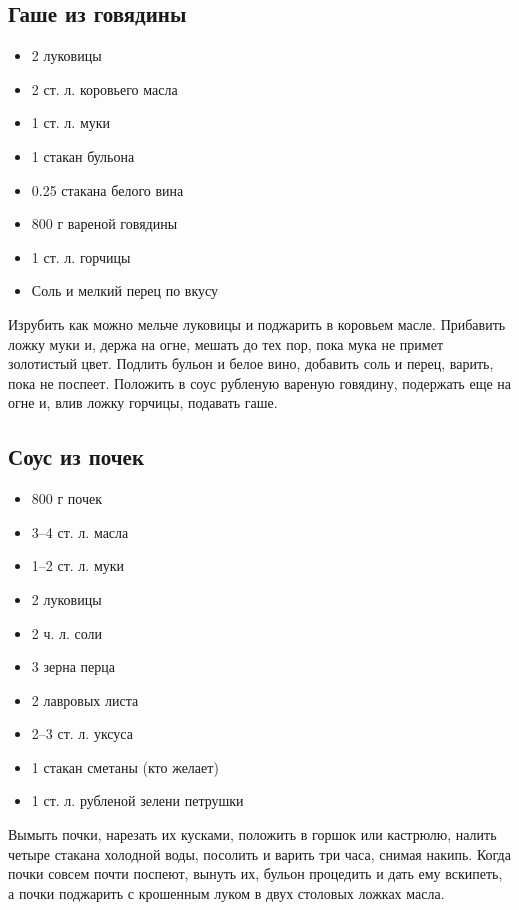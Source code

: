 \subsection{Гаше из говядины}

\begin{itemize}
	\item 2 луковицы
    \item 2 ст. л. коровьего масла 
    \item 1 ст. л. муки 
    \item 1 стакан бульона
    \item 0.25 стакана белого вина 
    \item 800 г вареной говядины
    \item 1 ст. л. горчицы
    \item Соль и мелкий перец по вкусу
\end{itemize}

Изрубить как можно мельче луковицы и поджарить в коровьем масле. Прибавить ложку муки и, держа на огне, мешать до тех пор, пока мука не примет золотистый цвет. Подлить бульон и белое вино, добавить соль и перец, варить, пока не поспеет. Положить в соус рубленую вареную говядину, подержать еще на огне и, влив ложку горчицы, подавать гаше.

\subsection{Соус из почек}

\begin{itemize}
	\item 800 г почек
    \item 3–4 ст. л. масла
    \item 1–2 ст. л. муки
    \item 2 луковицы
    \item 2 ч. л. соли 
    \item 3 зерна перца
    \item 2 лавровых листа
    \item 2–3 ст. л. уксуса
    \item 1 стакан сметаны (кто желает)
    \item 1 ст. л. рубленой зелени петрушки
\end{itemize}

Вымыть почки, нарезать их кусками, положить в горшок или кастрюлю, налить четыре стакана холодной воды, посолить и варить три часа, снимая накипь. Когда почки совсем почти поспеют, вынуть их, бульон процедить и дать ему вскипеть, а почки поджарить с крошенным луком в двух столовых ложках масла.

